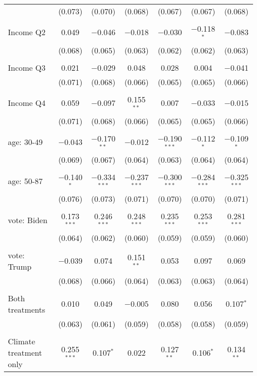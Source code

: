 \begin{tabular}{@{\extracolsep{5pt}}lcccccc}
  & (0.073) & (0.070) & (0.068) & (0.067) & (0.067) & (0.068) \\ 
  & & & & & & \\ 
 Income Q2 & 0.049 & $-$0.046 & $-$0.018 & $-$0.030 & $-$0.118$^{*}$ & $-$0.083 \\ 
  & (0.068) & (0.065) & (0.063) & (0.062) & (0.062) & (0.063) \\ 
  & & & & & & \\ 
 Income Q3 & 0.021 & $-$0.029 & 0.048 & 0.028 & 0.004 & $-$0.041 \\ 
  & (0.071) & (0.068) & (0.066) & (0.065) & (0.065) & (0.066) \\ 
  & & & & & & \\ 
 Income Q4 & 0.059 & $-$0.097 & 0.155$^{**}$ & 0.007 & $-$0.033 & $-$0.015 \\ 
  & (0.071) & (0.068) & (0.066) & (0.065) & (0.065) & (0.066) \\ 
  & & & & & & \\ 
 age: 30-49 & $-$0.043 & $-$0.170$^{**}$ & $-$0.012 & $-$0.190$^{***}$ & $-$0.112$^{*}$ & $-$0.109$^{*}$ \\ 
  & (0.069) & (0.067) & (0.064) & (0.063) & (0.064) & (0.064) \\ 
  & & & & & & \\ 
 age: 50-87 & $-$0.140$^{*}$ & $-$0.334$^{***}$ & $-$0.237$^{***}$ & $-$0.300$^{***}$ & $-$0.284$^{***}$ & $-$0.325$^{***}$ \\ 
  & (0.076) & (0.073) & (0.071) & (0.070) & (0.070) & (0.071) \\ 
  & & & & & & \\ 
 vote: Biden & 0.173$^{***}$ & 0.246$^{***}$ & 0.248$^{***}$ & 0.235$^{***}$ & 0.253$^{***}$ & 0.281$^{***}$ \\ 
  & (0.064) & (0.062) & (0.060) & (0.059) & (0.059) & (0.060) \\ 
  & & & & & & \\ 
 vote: Trump & $-$0.039 & 0.074 & 0.151$^{**}$ & 0.053 & 0.097 & 0.069 \\ 
  & (0.068) & (0.066) & (0.064) & (0.063) & (0.063) & (0.064) \\ 
  & & & & & & \\ 
 Both treatments & 0.010 & 0.049 & $-$0.005 & 0.080 & 0.056 & 0.107$^{*}$ \\ 
  & (0.063) & (0.061) & (0.059) & (0.058) & (0.058) & (0.059) \\ 
  & & & & & & \\ 
 Climate treatment only & 0.255$^{***}$ & 0.107$^{*}$ & 0.022 & 0.127$^{**}$ & 0.106$^{*}$ & 0.134$^{**}$ \\ 

\end{tabular}
